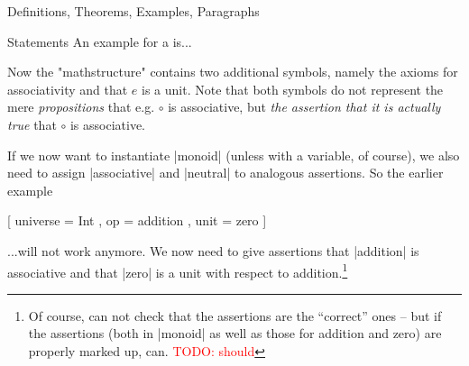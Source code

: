 \begin{sfragment}{Definitions, Theorems, Examples, Paragraphs}
\begin{smodule}{Statements}
{An example for a  is...
    }

    Now the \stexcode"mathstructure"  contains
    two additional symbols, namely the axioms for associativity
    and that $e$ is a unit. Note that both symbols do not
    represent the mere \emph{propositions} that e.g. 
    $\circ$ is associative, but \emph{the assertion that it is
    actually true} that $\circ$ is associative.
    
    If we now want to instantiate |monoid| (unless with a variable,
    of course), we also need to assign |associative| and |neutral|
    to analogous assertions. So the earlier example
    \begin{latexcode}[gobble=8]
        [
            universe = Int ,
            op = addition ,
            unit = zero
        ]
    \end{latexcode}
    ...will not work anymore. We now need to give assertions that
    |addition| is associative and that |zero| is a unit with respect
    to addition.\footnote{Of course, \sTeX can not check that
    the assertions are the ``correct'' ones -- but if
    the assertions (both in |monoid| as well as those for addition and
    zero) are properly marked up, \mmt can. \textcolor{red}{TODO: should}}

\end{smodule}
\end{sfragment}


